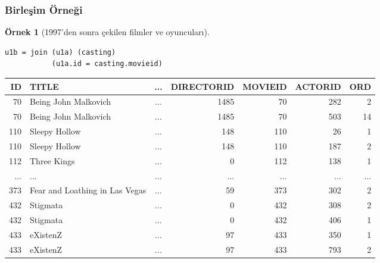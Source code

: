 \documentclass[dvipsnames]{beamer}
\theoremstyle{definition}
\theoremstyle{example}
\newtheorem{ornek}[theorem]{Örnek}
\theoremstyle{plain}
\begin{document}
\begin{frame}[fragile]
  \frametitle{Birleşim Örneği}

  \begin{ornek}[1997'den sonra çekilen filmler ve oyuncuları]
    \begin{lstlisting}
u1b = join (u1a) (casting)
           (u1a.id = casting.movieid)
    \end{lstlisting}

    \pause
    \begin{tiny}
    \begin{table}
      \begin{tabular}{|r|l|c|r|r|r|r|}\hline
 ID & TITLE                          & ... & DIRECTORID & MOVIEID & ACTORID & ORD\\\hline\hline
 70 & Being John Malkovich           & ... &       1485 &      70 &     282 &   2\\\hline
 70 & Being John Malkovich           & ... &       1485 &      70 &     503 &  14\\\hline
110 & Sleepy Hollow                  & ... &        148 &     110 &      26 &   1\\\hline
110 & Sleepy Hollow                  & ... &        148 &     110 &     187 &   2\\\hline
112 & Three Kings                    & ... &          0 &     112 &     138 &   1\\\hline
... & ...                            & ... &        ... &     ... &     ... & ...\\\hline
373 & Fear and Loathing in Las Vegas & ... &         59 &     373 &     302 &   2\\\hline
432 & Stigmata                       & ... &          0 &     432 &     308 &   2\\\hline
432 & Stigmata                       & ... &          0 &     432 &     406 &   1\\\hline
433 & eXistenZ                       & ... &         97 &     433 &     350 &   1\\\hline
433 & eXistenZ                       & ... &         97 &     433 &     793 &   2\\\hline
      \end{tabular}
    \end{table}
    \end{tiny}
  \end{ornek}
\end{frame}
\end{document}
